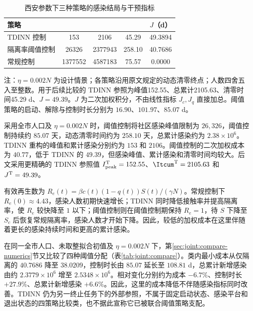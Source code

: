 \begin{table}[htbp]
\centering\small
\setlength{\tabcolsep}{3.5pt}
\renewcommand{\arraystretch}{1.25}
\begin{threeparttable}
\caption{西安参数下三种策略的感染结局与干预指标}
\label{tab:xian_summary}
\begin{tabular*}{\linewidth}{@{\extracolsep{\fill}}lS[table-format=7.0]S[table-format=7.0]S[table-format=3.2]S[table-format=2.4]@{}}
\toprule
策略 & {} & {} & {} & {$J$（d）}\\
\midrule
TDINN 控制 & 153 & 2106 & 45.29 & 49.3894\\
隔离率阈值控制 & 26326 & 2377943 & 258.10 & 40.7686\\
常规控制 & 1377552 & 4587183 & 75.57 & 0.0000\\
\bottomrule
\end{tabular*}
\begin{tablenotes}[flushleft]\footnotesize
\item 注：$\eta=0.002N$ 为设计情景；各策略沿用原文规定的动态清零终点；人数四舍五入至整数。用于后续比较的 TDINN 参照为峰值152.55、总累计2105.63、清零时间45.29 d、$J=49.39$。$J$ 为二次加权积分，不由线性指标 $J_c,J_q$ 直接加总。阈值策略的启动、解除与控制时长分别为 $16.90$、$101.97$、$85.07$ d。
\end{tablenotes}
\end{threeparttable}
\end{table}


采用全市人口及 $\eta=0.002N$ 时，阈值控制将社区感染峰值限制为 $26{,}326$，阈值控制持续约 $85.07$ 天，动态清零时间约为 $258.10$ 天，总累计感染约为 $2.38\times10^6$。TDINN 重构的峰值和累计感染分别约为 $153$ 和 $2106$。阈值控制的二次加权成本为 $40.77$，低于 TDINN 的 $49.39$，但感染峰值、累计感染和清零时间均较大。后文采用更精确的 TDINN 参照值 $I_{\rm peak}^{\rm T}=152.55$、$\Itcum^{\rm T}=2105.63$ 和 $J^{\rm T}=49.39$。

有效再生数为 $R_e(t)=\beta c(t)(1-q(t))S(t)/(\gamma N)$。常规控制下 $R_e(0)\approx4.43$，感染人数初期快速增长；TDINN 同时降低接触率并提高隔离率，使 $R_e$ 较快降至 $1$ 以下；阈值控制则在阈值控制期保持 $R_e=1$，待 $S$ 下降至 $S_c$ 后恢复常规隔离率，感染人数才开始下降。因此，较低的加权成本在这里伴随着更长的感染持续时间和更高的累计感染。

在同一全市人口、未取整拟合初值及 $\eta=0.002N$ 下，第\ref{sec:joint:compare-numerics}节又比较了四种阈值分配（表\ref{tab:joint:compare}）。类内最小成本从仅隔离的 $40.7686$ 降至 $38.0209$，控制时长由 $85.07$ 延长至 $108.81$ d，总累计新增感染由约 $2.3779\times10^6$ 增至 $2.5348\times10^6$。相对变化分别约为成本 $-6.7\%$、控制时长 $+27.9\%$、总累计新增感染 $+6.6\%$。因此，这里的成本降低不伴随感染指标同时改善。TDINN 仍为另一终止任务下的外部参照，不属于固定启动状态、感染平台和退出状态的四策略比较类，也不据此宣称它已被联合阈值策略支配。


